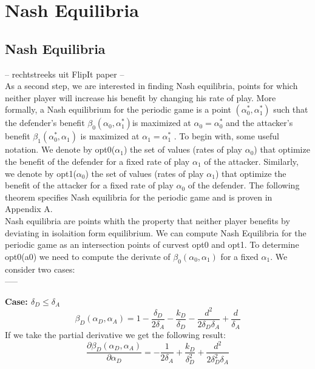 \chapter{Nash Equilibria}
\label{chapter:Nash}
%


\section{Nash Equilibria}
-- rechtstreeks uit FlipIt paper --\\
As a second step, we are interested in finding Nash equilibria, points
for which neither player will increase his benefit by changing his rate of play. More
formally, a Nash equilibrium for the periodic game is a point $(\alpha_{0}^{*},\alpha_{1}^{*})$ such that
the defender's benefit $\beta_{0}(\alpha_{0},\alpha_{1}^{*}) $is maximized at $\alpha_{0}= \alpha_{0}^{*}$ and the attacker's benefit
$\beta_{1}(\alpha_{0}^{*},\alpha_{1}) $ is maximized at $\alpha_{1}= \alpha_{1}^{*}$ .
To begin with, some useful notation. We denote by opt0($\alpha_{1}$) the set of values (rates
of play $\alpha_{0}$) that optimize the benefit of the defender for a fixed rate of play $\alpha_{1}$ of the
attacker. Similarly, we denote by opt1($\alpha_{0}$) the set of values (rates of play $\alpha_{1}$) that optimize
the benefit of the attacker for a fixed rate of play $\alpha_{0}$ of the defender. The following
theorem specifies Nash equilibria for the periodic game and is proven in Appendix A. \\

Nash equilibria are points whith the property that neither player benefits by deviating in isolaition form equilibrium. We can compute Nash Equilibria for the periodic game as an intersection points of curvest opt0 and opt1. To determine opt0(a0) we need to compute the derivate of  $\beta_{0}(\alpha_{0},\alpha_{1}) $ for a fixed $\alpha_{1}$. We consider two cases:\\
-----

\textbf{Case: $\delta_{D} \leq \delta_{A} $}\\

\begin{equation}
\beta_{D}(\alpha_{D},\alpha_{A}) = 1 - \dfrac{\delta_{D}}{2\delta_{A}} - \dfrac{k_{D}}{\delta_{D}} - \dfrac{d^{2}}{2\delta_{D}\delta_{A}} + \dfrac{d}{\delta_{A}}
\end{equation}
If we take the partial derivative we get the following result:
\begin{equation}\label{formdelta}
\frac{\partial \beta_{D}(\alpha_{D},\alpha_{A})}{\partial \alpha_{D}} = - \dfrac{1}{2\delta_{A}} + \dfrac{k_{D}}{\delta_{D}^{2}} + \dfrac{d^{2}}{2\delta_{D}^{2}\delta_{A}}
\end{equation}

